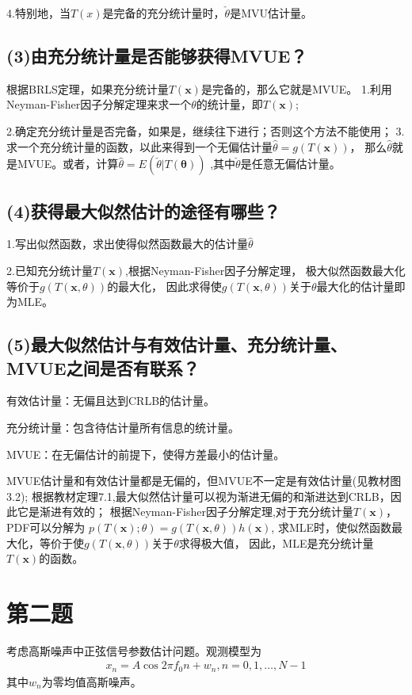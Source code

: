 \documentclass[fontset=windows]{article}
\numberwithin{figure}{section}
\begin{document}
4.特别地，当\(T(x)\)是完备的充分统计量时，\(\check{\theta}\)是MVU估计量。

\subsection*{(3)由充分统计量是否能够获得MVUE？}
根据BRLS定理，如果充分统计量\(T(\mathbf{x})\)是完备的，那么它就是MVUE。
1.利用Neyman-Fisher因子分解定理来求一个\(\theta\)的统计量，即\(T(\mathbf{x})\);

2.确定充分统计量是否完备，如果是，继续往下进行；否则这个方法不能使用；
3.求一个充分统计量的函数，以此来得到一个无偏估计量\(\hat{\theta}=g(T(\mathbf{x}))\)，
那么\(\hat{\theta}\)就是MVUE。或者，计算\(\hat{\theta}=E(\check{\theta}|T(\mathbf{\theta}))\)
,其中\(\check{\theta}\)是任意无偏估计量。

\subsection*{(4)获得最大似然估计的途径有哪些？}
1.写出似然函数，求出使得似然函数最大的估计量\(\hat{\theta}\)

2.已知充分统计量\(T(\mathbf{x})\),根据Neyman-Fisher因子分解定理，
极大似然函数最大化等价于\(g(T(\mathbf{x},\theta))\)的最大化，
因此求得使\(g(T(\mathbf{x},\theta))\)关于\(\theta\)最大化的估计量即为MLE。

\subsection*{(5)最大似然估计与有效估计量、充分统计量、MVUE之间是否有联系？}
有效估计量：无偏且达到CRLB的估计量。

充分统计量：包含待估计量所有信息的统计量。

MVUE：在无偏估计的前提下，使得方差最小的估计量。

MVUE估计量和有效估计量都是无偏的，但MVUE不一定是有效估计量(见教材图3.2);
根据教材定理7.1,最大似然估计量可以视为渐进无偏的和渐进达到CRLB，因此它是渐进有效的；
根据Neyman-Fisher因子分解定理,对于充分统计量\(T(\mathbf{x})\)，PDF可以分解为
\(p(T(\mathbf{x});\theta)=g(T(\mathbf{x},\theta))h(\mathbf{x})\),
求MLE时，使似然函数最大化，等价于使\(g(T(\mathbf{x},\theta))\)关于\(\theta\)求得极大值，
因此，MLE是充分统计量\(T(\mathbf{x})\)的函数。

\section{第二题}
考虑高斯噪声中正弦信号参数估计问题。观测模型为
\begin{align*}
	x_n=A\cos2\pi f_0 n+w_n,n=0,1,…,N-1
\end{align*}
其中\(w_n\)为零均值高斯噪声。
\end{document}
